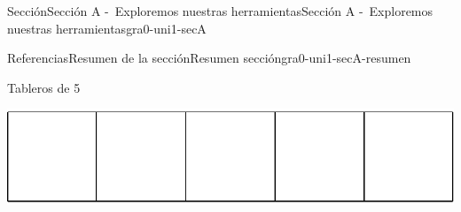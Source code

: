 \documentclass[twoside,10pt,]{article}
\begin{document}
\begin{sectionptx}{Sección}{Sección A -~Exploremos nuestras herramientas}{}{Sección A -~Exploremos nuestras herramientas}{}{}{gra0-uni1-secA}
\begin{references-subsection}{Referencias}{Resumen de la sección}{}{Resumen sección}{}{}{gra0-uni1-secA-resumen}
\begin{sidebyside}{2}{0.05}{0.05}{0.1}
\begin{sbspanel}{0.4}
Tableros de 5%
\par
\includegraphics[width=\linewidth]{external/svg-source/tikz-file-148144.pdf}
\end{sbspanel}%
\begin{sbspanel}{0.4}%
%
\end{sbspanel}%
\end{sidebyside}%
\end{references-subsection}
\end{sectionptx}
%
%
\typeout{************************************************}
\typeout{************************************************}
%
\end{document}
